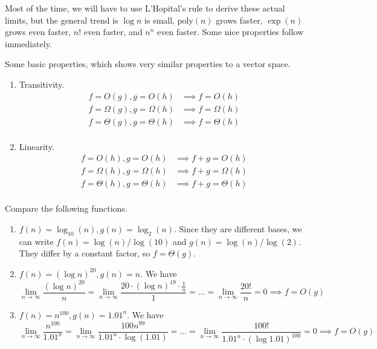 Most of the time, we will have to use L'Hopital's rule to derive these actual limits, but the general trend is $\log n$ is small, $\mathrm{poly}(n)$ grows faster, $\exp(n)$ grows even faster, $n!$ even faster, and $n^n$ even faster. Some nice properties follow immediately. 

\begin{theorem}[Properties]
  Some basic properties, which shows very similar properties to a vector space. 
  \begin{enumerate}
    \item Transitivity. 
    \begin{align}
      f = O(g), g = O(h) & \implies f = O(h) \\
      f = \Omega(g), g = \Omega(h) & \implies f = \Omega(h) \\
      f = \Theta(g), g = \Theta(h) & \implies f = \Theta(h) \\
    \end{align}

    \item Linearity.  
      \begin{align}
        f = O(h), g = O(h) & \implies f + g = O(h) \\
        f = \Omega(h), g = \Omega(h) & \implies f + g = \Omega(h) \\
        f = \Theta(h), g = \Theta(h) & \implies f + g = \Theta(h) \\
      \end{align}
  \end{enumerate}
\end{theorem}

\begin{example}
  Compare the following functions. 
  \begin{enumerate}
    \item $f(n) = \log_{10} (n), g(n) = \log_2 (n)$. Since they are different bases, we can write $f(n) = \log (n) / \log (10)$ and $g(n) = \log(n) / \log(2)$. They differ by a constant factor, so $f = \Theta(g)$. 

    \item $f(n) = (\log n)^{20}, g(n) = n$. We have 
    \begin{equation}
      \lim_{n \rightarrow \infty} \frac{(\log n)^20}{n} = \lim_{n \rightarrow \infty} \frac{20 \cdot (\log n)^{19} \cdot \frac{1}{n}}{1} = \ldots = \lim_{n \rightarrow \infty} \frac{20!}{n} = 0 \implies f = O(g)
    \end{equation}

    \item $f(n) = n^{100}, g(n) = 1.01^n$. We have 
      \begin{equation}
        \lim_{n \rightarrow \infty} \frac{n^{100}}{1.01^n} = \lim_{n \rightarrow \infty} \frac{100 n^{99}}{1.01^n \cdot \log (1.01)} =  \ldots = \lim_{n \rightarrow \infty} \frac{100!}{1.01^n \cdot (\log 1.01)^100} = 0 \implies f = O(g)
      \end{equation}
  \end{enumerate}
\end{example}

